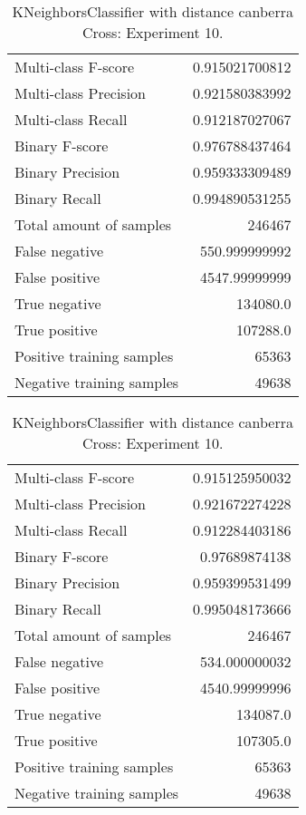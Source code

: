 \begin{table}[H]
\begin{minipage}{0.5\textwidth}
\caption{KNeighborsClassifier with distance canberra Cross: Experiment 9.}
\centering
\begin{tabular}{l r}
\toprule
Multi-class F-score & 0.915021700812 \\
Multi-class Precision & 0.921580383992 \\
Multi-class Recall & 0.912187027067 \\
\midrule
Binary F-score & 0.976788437464 \\
Binary Precision & 0.959333309489 \\
Binary Recall & 0.994890531255 \\
\midrule
Total amount of samples & 246467 \\
False negative & 550.999999992 \\
False positive & 4547.99999999 \\
True negative & 134080.0 \\
True positive & 107288.0 \\
\midrule
Positive training samples & 65363 \\
Negative training samples & 49638 \\
\bottomrule
\end{tabular}
\end{minipage}
\hfillx
\begin{minipage}{0.5\textwidth}
\caption{KNeighborsClassifier with distance canberra Cross: Experiment 10.}
\centering
\begin{tabular}{l r}
\toprule
Multi-class F-score & 0.915125950032 \\
Multi-class Precision & 0.921672274228 \\
Multi-class Recall & 0.912284403186 \\
\midrule
Binary F-score & 0.97689874138 \\
Binary Precision & 0.959399531499 \\
Binary Recall & 0.995048173666 \\
\midrule
Total amount of samples & 246467 \\
False negative & 534.000000032 \\
False positive & 4540.99999996 \\
True negative & 134087.0 \\
True positive & 107305.0 \\
\midrule
Positive training samples & 65363 \\
Negative training samples & 49638 \\
\bottomrule
\end{tabular}
\end{minipage}
\end{table}
